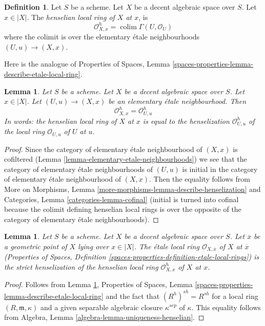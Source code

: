 \documentclass{stacks-project}
\theoremstyle{plain}
\newtheorem{lemma}[subsection]{Lemma}
\theoremstyle{definition}
\newtheorem{definition}[subsection]{Definition}
\theoremstyle{remark}
\numberwithin{equation}{subsection}
\def\colim{\mathop{\mathrm{colim}}\nolimits}
\begin{document}
\begin{definition}
\label{definition-henselian-local-ring}
Let $S$ be a scheme. Let $X$ be a decent algebraic space over $S$.
Let $x \in |X|$. The {\it henselian local ring of $X$ at $x$}, is
$$
\mathcal{O}_{X, x}^h = \colim \Gamma(U, \mathcal{O}_U)
$$
where the colimit is over the elementary \'etale neighbourhoods
$(U, u) \to (X, x)$.
\end{definition}

\noindent
Here is the analogue of
Properties of Spaces, Lemma
\ref{spaces-properties-lemma-describe-etale-local-ring}.

\begin{lemma}
\label{lemma-describe-henselian-local-ring}
Let $S$ be a scheme. Let $X$ be a decent algebraic space over $S$.
Let $x \in |X|$. Let $(U, u) \to (X, x)$ be an elementary
\'etale neighbourhood. Then
$$
\mathcal{O}_{X, x}^h = \mathcal{O}_{U, u}^h
$$
In words: the henselian local ring of $X$ at $x$
is equal to the henselization $\mathcal{O}_{U, u}^h$
of the local ring $\mathcal{O}_{U, u}$ of $U$ at $u$.
\end{lemma}

\begin{proof}
Since the category of elementary \'etale neighbourhood of $(X, x)$
is cofiltered (Lemma \ref{lemma-elementary-etale-neighbourhoods})
we see that
the category of elementary \'etale neighbourhoods of $(U, u)$
is initial in
the category of elementary \'etale neighbourhood of $(X, x)$.
Then the equality follows from
More on Morphisms, Lemma \ref{more-morphisms-lemma-describe-henselization}
and
Categories, Lemma \ref{categories-lemma-cofinal}
(initial is turned into cofinal because the colimit
defining henselian local rings is over the
opposite of the category of elementary
\'etale neighbourhoods).
\end{proof}

\begin{lemma}
\label{lemma-henselian-local-ring-strict}
Let $S$ be a scheme. Let $X$ be a decent algebraic space over $S$.
Let $\overline{x}$ be a geometric point of $X$ lying over $x \in |X|$. 
The \'etale local ring $\mathcal{O}_{X, \overline{x}}$ of $X$ at $\overline{x}$
(Properties of Spaces, Definition
\ref{spaces-properties-definition-etale-local-rings})
is the strict henselization
of the henselian local ring $\mathcal{O}_{X, x}^h$ of $X$ at $x$.
\end{lemma}

\begin{proof}
Follows from Lemma \ref{lemma-describe-henselian-local-ring},
Properties of Spaces, Lemma
\ref{spaces-properties-lemma-describe-etale-local-ring}
and the fact that $(R^h)^{sh} = R^{sh}$
for a local ring $(R, \mathfrak m, \kappa)$ and a given
separable algebraic closure $\kappa^{sep}$ of $\kappa$.
This equality follows from
Algebra, Lemma \ref{algebra-lemma-uniqueness-henselian}.
\end{proof}
\end{document}
